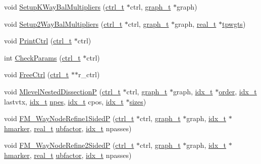 \begin{DoxyCompactItemize}
\item 
void \hyperlink{a00945_a3444d1d3ffb5ca450a1affaeb6d71b61}{Setup\+K\+Way\+Bal\+Multipliers} (\hyperlink{a00742}{ctrl\+\_\+t} $\ast$ctrl, \hyperlink{a00734}{graph\+\_\+t} $\ast$graph)
\item 
void \hyperlink{a00945_ab7bde9f22de07a798b97f1f8e83768b1}{Setup2\+Way\+Bal\+Multipliers} (\hyperlink{a00742}{ctrl\+\_\+t} $\ast$ctrl, \hyperlink{a00734}{graph\+\_\+t} $\ast$graph, \hyperlink{a00876_a1924a4f6907cc3833213aba1f07fcbe9}{real\+\_\+t} $\ast$\hyperlink{a00879_aa91786cd8ea996ec49ed5b382eb7fc2f}{tpwgts})
\item 
void \hyperlink{a00945_a2c75ede1a41b19cb3705b998aba3200b}{Print\+Ctrl} (\hyperlink{a00742}{ctrl\+\_\+t} $\ast$ctrl)
\item 
int \hyperlink{a00945_a279ffe27d8412909f9117b5ca4721dce}{Check\+Params} (\hyperlink{a00742}{ctrl\+\_\+t} $\ast$ctrl)
\item 
void \hyperlink{a00945_ab44b3384fa925eae532b7bcc825159d7}{Free\+Ctrl} (\hyperlink{a00742}{ctrl\+\_\+t} $\ast$$\ast$r\+\_\+ctrl)
\item 
void \hyperlink{a00945_a55cff7f4deda5d27c8736089a878964c}{Mlevel\+Nested\+DissectionP} (\hyperlink{a00742}{ctrl\+\_\+t} $\ast$ctrl, \hyperlink{a00734}{graph\+\_\+t} $\ast$graph, \hyperlink{a00876_aaa5262be3e700770163401acb0150f52}{idx\+\_\+t} $\ast$\hyperlink{a00611_aab21ede0c02820806e77fd7890ee6bd7}{order}, \hyperlink{a00876_aaa5262be3e700770163401acb0150f52}{idx\+\_\+t} lastvtx, \hyperlink{a00876_aaa5262be3e700770163401acb0150f52}{idx\+\_\+t} \hyperlink{a00879_ae38a1cbfe208369db2829161d741da57}{npes}, \hyperlink{a00876_aaa5262be3e700770163401acb0150f52}{idx\+\_\+t} cpos, \hyperlink{a00876_aaa5262be3e700770163401acb0150f52}{idx\+\_\+t} $\ast$\hyperlink{a00879_aa2b865ca95a167fa6c34c48e9847379c}{sizes})
\item 
void \hyperlink{a00945_a1d2b2b5145f4556102f25c25570bb80e}{F\+M\+\_\+Way\+Node\+Refine1\+SidedP} (\hyperlink{a00742}{ctrl\+\_\+t} $\ast$ctrl, \hyperlink{a00734}{graph\+\_\+t} $\ast$graph, \hyperlink{a00876_aaa5262be3e700770163401acb0150f52}{idx\+\_\+t} $\ast$\hyperlink{a00879_a2d0a403870cf657adf972e808622d7c7}{hmarker}, \hyperlink{a00876_a1924a4f6907cc3833213aba1f07fcbe9}{real\+\_\+t} \hyperlink{a00879_a32dfbc289fd431c9ca9aca2e6fb3e7b8}{ubfactor}, \hyperlink{a00876_aaa5262be3e700770163401acb0150f52}{idx\+\_\+t} npasses)
\item 
void \hyperlink{a00945_a2e0b580a44dc7ec102b48ba7bf6b3797}{F\+M\+\_\+Way\+Node\+Refine2\+SidedP} (\hyperlink{a00742}{ctrl\+\_\+t} $\ast$ctrl, \hyperlink{a00734}{graph\+\_\+t} $\ast$graph, \hyperlink{a00876_aaa5262be3e700770163401acb0150f52}{idx\+\_\+t} $\ast$\hyperlink{a00879_a2d0a403870cf657adf972e808622d7c7}{hmarker}, \hyperlink{a00876_a1924a4f6907cc3833213aba1f07fcbe9}{real\+\_\+t} \hyperlink{a00879_a32dfbc289fd431c9ca9aca2e6fb3e7b8}{ubfactor}, \hyperlink{a00876_aaa5262be3e700770163401acb0150f52}{idx\+\_\+t} npasses)
$$
\end{DoxyCompactItemize}
